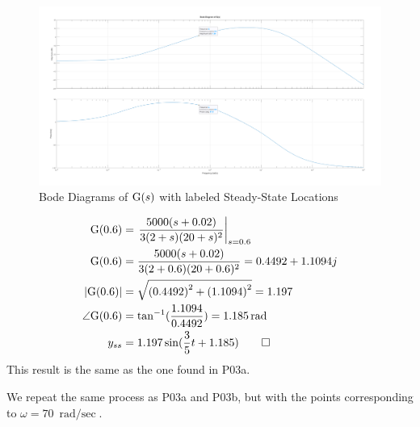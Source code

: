 \begin{hwkProblem}{3}{}
	\begin{figure}[H]
		\begin{center}
			\includegraphics[width=\textwidth]{./images/s03a.png}
		\end{center}
		\caption{Bode Diagrams of \( \func{G}[s] \) with labeled Steady-State Locations}\label{fig:s03a}
	\end{figure}

	\hwkPart{}
	
	\begin{align*}
		\func{G}[0.6] &= \left. \frac{5000(s+0.02)}{3(2+s)(20+s)^{2}}\right|_{s=0.6} \\
		\func{G}[0.6] &= \frac{5000(s+0.02)}{3(2+0.6)(20+0.6)^{2}} = 0.4492 + 1.1094j \\
		|\func{G}[0.6]| &= \sqrt{\left(0.4492\right)^{2}+\left(1.1094\right)^{2}} = 1.197 \\
		\angle \func{G}[0.6] &= \tan^{-1}(\frac{1.1094}{0.4492}) = \qty{1.185}{\radian} \\
		y_{ss} &= 1.197 \sin(\frac{3}{5}t+1.185) \qed
	\end{align*}
	This result is the same as the one found in P03a.

	\hwkPart{}

	We repeat the same process as P03a and P03b, but with the points corresponding to \( \omega = \qty{70}{\radian\per\sec} \).
	

\end{hwkProblem}
